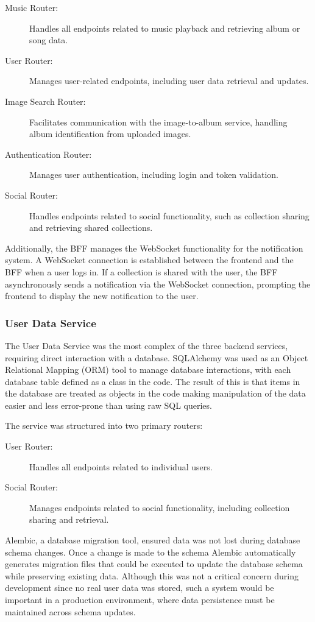 \begin{description}
    \item[Music Router:] Handles all endpoints related to music playback and retrieving album or song data.
    \item[User Router:] Manages user-related endpoints, including user data retrieval and updates.
    \item[Image Search Router:] Facilitates communication with the image-to-album service, handling album identification from uploaded images.
    \item[Authentication Router:] Manages user authentication, including login and token validation.
    \item[Social Router:] Handles endpoints related to social functionality, such as collection sharing and retrieving shared collections.
\end{description}

Additionally, the BFF manages the WebSocket functionality for the notification system. A WebSocket connection is established between the frontend and the BFF when a user logs in. If a collection is shared with the user, the BFF asynchronously sends a notification via the WebSocket connection, prompting the frontend to display the new notification to the user.

\subsubsection{User Data Service}
The User Data Service was the most complex of the three backend services, requiring direct interaction with a database. SQLAlchemy was used as an Object Relational Mapping (ORM) tool to manage database interactions, with each database table defined as a class in the code. The result of this is that items in the database are treated as objects in the code making manipulation of the data easier and less error-prone than using raw SQL queries.

The service was structured into two primary routers:

\begin{description}
    \item[User Router:] Handles all endpoints related to individual users.
    \item[Social Router:] Manages endpoints related to social functionality, including collection sharing and retrieval.
\end{description}

Alembic, a database migration tool, ensured data was not lost during database schema changes. Once a change is made to the schema Alembic automatically generates migration files that could be executed to update the database schema while preserving existing data. Although this was not a critical concern during development since no real user data was stored, such a system would be important in a production environment, where data persistence must be maintained across schema updates.


